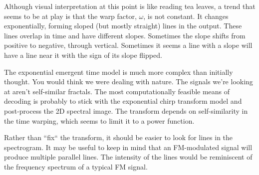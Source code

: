 Although visual interpretation at this point is like reading tea leaves,
a trend that seems to be at play is that the warp factor, $\omega$, is not
constant. It changes exponentially, forming sloped (but mostly straight) lines
in the output.
These lines overlap in time and have different slopes.
Sometimes the slope shifts from positive to negative, through vertical.
Sometimes it seems a line with a slope will have a line near it with the
sign of its slope flipped.

The exponential emergent time model is much more complex than initially thought.
You would think we were dealing with nature.
The signals we're looking at aren't self-similar fractals.
The most computationally feasible means of decoding is probably to stick with
the exponential chirp transform model and post-process the 2D spectral image.
The transform depends on self-similarity in the time warping, which seems to
limit it to a power function. 

Rather than ``fix`` the transform, it should be easier to 
look for lines in the spectrogram.
It may be useful to keep in mind that an FM-modulated signal will produce
multiple parallel lines. The intensity of the lines would be reminiscent
of the frequency spectrum of a typical FM signal.
